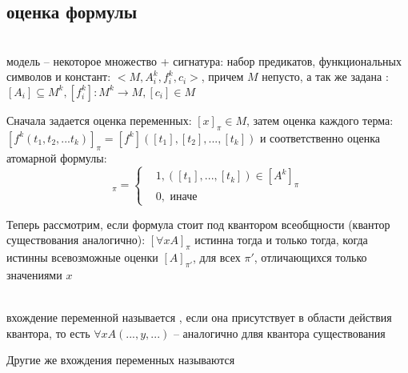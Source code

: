 \subsection{оценка формулы}
\begin{definition}  \\
модель -- некоторое множество + сигнатура: набор предикатов, функциональных символов и констант: $<M,  A_i^k , f_i^k , c_i>$, причем $M$ непусто, а так же задана  : $[A_i] \subseteq M^k , [f^k_i]: M^k \to M , [c_i] \in M$
\end{definition}
Сначала задается оценка переменных: $[x]_{\pi} \in M$, затем оценка каждого терма: $[f^k(t_1, t_2 , ... t_k)]_{\pi} = [f^k]([t_1], [t_2] , ..., [t_k])$ и соответственно оценка атомарной формулы:
\begin{equation}
    [A^k(t_1, ... , t_k)]_{\pi} = \left\{ \begin{aligned}
            &1 , ([t_1], ... , [t_k]) \in [A^k]_{\pi} \\
            &0 , \text { иначе}
    \end{aligned} \right.
\end{equation}

Теперь рассмотрим, если формула стоит под квантором всеобщности (квантор существования аналогично): $[\forall x A]_{\pi}$ истинна тогда и только тогда, когда истинны всевозможные оценки $[A]_{\pi '}$, для всех $\pi '$, отличающихся только значениями $x$\\

\begin{definition}  \\
вхождение переменной называется , если она присутствует в области действия квантора, то есть $\forall x A(..., y , ...)$ -- аналогично длвя квантора существования
\end{definition}
Другие же вхождения переменных называются 
 
